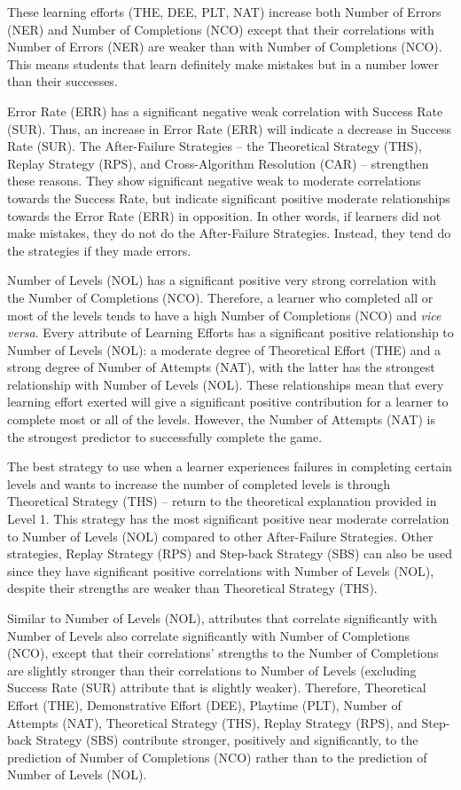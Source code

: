 \documentclass[conference]{IEEEtran}
\begin{document}
These learning efforts (THE, DEE, PLT, NAT) increase both Number of Errors (NER) and Number of Completions (NCO) except that their correlations with Number of Errors (NER) are weaker than with Number of Completions (NCO). This means students that learn definitely make mistakes but in a number lower than their successes.

Error Rate (ERR) has a significant negative weak correlation with Success Rate (SUR). Thus, an increase in Error Rate (ERR) will indicate a decrease in Success Rate (SUR). The After-Failure Strategies -- the Theoretical Strategy (THS), Replay Strategy (RPS), and Cross-Algorithm Resolution (CAR) -- strengthen these reasons. They show significant negative weak to moderate correlations towards the Success Rate, but indicate significant positive moderate relationships towards the Error Rate (ERR) in opposition. In other words, if learners did not make mistakes, they do not do the After-Failure Strategies. Instead, they tend do the strategies if they made errors. 

Number of Levels (NOL) has a significant positive very strong correlation with the Number of Completions (NCO). Therefore, a learner who completed all or most of the levels tends to have a high Number of Completions (NCO) and \textit{vice versa}. Every attribute of Learning Efforts has a significant positive relationship to Number of Levels (NOL): a moderate degree of Theoretical Effort (THE) and a strong degree of Number of Attempts (NAT), with the latter has the strongest relationship with Number of Levels (NOL). These relationships mean that every learning effort exerted will give a significant positive contribution for a learner to complete most or all of the levels. However, the Number of Attempts (NAT) is the strongest predictor to successfully complete the game. 

The best strategy to use when a learner experiences failures in completing certain levels and wants to increase the number of completed levels is through Theoretical Strategy (THS) -- return to the theoretical explanation provided in Level 1. This strategy has the most significant positive near moderate correlation to Number of Levels (NOL) compared to other After-Failure Strategies. Other strategies, Replay Strategy (RPS) and Step-back Strategy (SBS) can also be used since they have significant positive correlations with Number of Levels (NOL), despite their strengths are weaker than Theoretical Strategy (THS).

Similar to Number of Levels (NOL), attributes that correlate significantly with Number of Levels also correlate significantly with Number of Completions (NCO), except that their correlations’ strengths to the Number of Completions are slightly stronger than their correlations to Number of Levels (excluding Success Rate (SUR) attribute that is slightly weaker). Therefore, Theoretical Effort (THE), Demonstrative Effort (DEE), Playtime (PLT), Number of Attempts (NAT), Theoretical Strategy (THS), Replay Strategy (RPS), and Step-back Strategy (SBS) contribute stronger, positively and significantly, to the prediction of Number of Completions (NCO) rather than to the prediction of Number of Levels (NOL).
\end{document}
